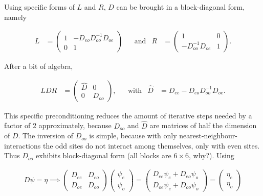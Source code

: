 \documentclass{article}
\theoremstyle{plain} %
\theoremstyle{convention} %
\theoremstyle{remark} %
\numberwithin{equation}{section}
\begin{document}
Using specific forms of $L$ and $R$, $D$ can be brought in a block-diagonal form, namely

\begin{align*}
    L &= 
        \begin{pmatrix}
        1 & -D_{eo} D_{oo}^{-1} D_{oe} \\
        0 & 1
        \end{pmatrix}
    & &\text{and} &
    R &= 
        \begin{pmatrix}
        1 & 0 \\
        -D_{oo}^{-1} D_{oe} & 1
        \end{pmatrix}.
\end{align*}

After a bit of algebra,

\begin{align*}
    L D R &= 
        \begin{pmatrix}
        \hat{D} & 0 \\
        0 & D_{oo}
        \end{pmatrix},
    & &\text{with} &
    \hat{D} &= D_{ee} - D_{eo} D_{oo}^{-1} D_{oe}.
\end{align*}

This specific preconditioning reduces the amount of iterative steps needed by a factor of \num{2} approximately, because $D_{oo}$ and $\hat{D}$ are matrices of half the dimension of $D$. The inversion of $D_{oo}$ is simple, because with only nearest-neighbour-interactions the odd sites do not interact among themselves, only with even sites. Thus $D_{oo}$ exhibits block-diagonal form (all blocks are $6 \times 6$, why?). Using

\begin{align*}
    D \psi = \eta \implies \begin{pmatrix}
    D_{ee} & D_{eo} \\
    D_{oe} & D_{oo}
    \end{pmatrix} \begin{pmatrix} \psi_e \\ \psi_o \end{pmatrix} = \begin{pmatrix} D_{ee} \psi_e + D_{eo} \psi_o \\ D_{oe}\psi_e + D_{oo} \psi_o \end{pmatrix} = \begin{pmatrix} \eta_e \\ \eta_o \end{pmatrix}
\end{align*}
\end{document}
